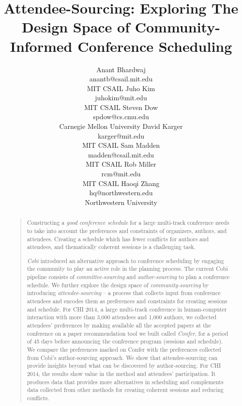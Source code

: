 \documentclass[letterpaper]{article}
\begin{document}
%
\title{Attendee-Sourcing: Exploring The Design Space of Community-Informed Conference Scheduling}
\author{
Anant Bhardwaj \\
anantb@csail.mit.edu\\
MIT CSAIL
\And
Juho Kim\\
juhokim@mit.edu\\
MIT CSAIL
\And
Steven Dow \\
spdow@cs.cmu.edu\\
Carnegie Mellon University
\AND
David Karger \\
karger@mit.edu\\
MIT CSAIL
\And
Sam Madden \\
madden@csail.mit.edu\\
MIT CSAIL
\And
Rob Miller\\
rcm@mit.edu\\
MIT CSAIL
\And
Haoqi Zhang \\
hq@northwestern.edu\\
Northwestern University
}
\maketitle
\begin{abstract}
\begin{quote}
Constructing a \emph{good conference schedule} for a large multi-track conference needs to take into account the preferences and constraints of organizers, authors, and attendees. Creating a schedule which has fewer conflicts for authors and attendees, and thematically coherent sessions is a challenging task. 

\emph{Cobi} introduced an alternative approach to conference scheduling by engaging the community to play an active role in the planning process. The current Cobi pipeline consists of \emph{committee-sourcing} and \emph{author-sourcing} to plan a conference schedule. We further explore the design space of \emph{community-sourcing} by introducing \emph{attendee-sourcing} -- a process that collects input from conference attendees and encodes them as preferences and constraints for creating sessions and schedule.  For CHI 2014, a large multi-track conference in human-computer interaction with more than 3,000 attendees and 1,000 authors, we collected attendees' preferences by making available all the accepted papers at the conference on a paper recommendation tool we built called \emph{Confer}, for a period of 45 days before announcing the conference program (sessions and schedule). We compare the preferences marked on Confer with the preferences collected from Cobi's author-sourcing approach. We show that attendee-sourcing can provide insights beyond what can be discovered by author-sourcing. For CHI 2014, the results show value in the method and attendees' participation. It produces data that provides more alternatives in scheduling and complements data collected from other methods for creating coherent sessions and reducing conflicts.
\end{quote}
\end{abstract}
\noindent
\end{document}
